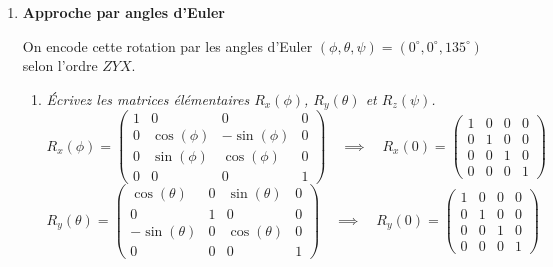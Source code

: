 \documentclass[a4paper,12pt]{article}
\begin{document}
\begin{enumerate}
    \item \textbf{Approche par angles d’Euler}

          On encode cette rotation par les angles d’Euler $(\phi, \theta, \psi) = (0^\circ, 0^\circ, 135^\circ)$ selon l’ordre $ZYX$.
          \begin{enumerate}
              \item \emph{Écrivez les matrices élémentaires $R_x(\phi)$, $R_y(\theta)$ et $R_z(\psi)$.}
              \begin{equation}
              R_x(\phi) = 
              \begin{pmatrix}
              1 & 0 & 0 & 0 \\
              0 & \cos(\phi) & -\sin(\phi) & 0 \\
              0 & \sin(\phi) & \cos(\phi) & 0 \\
              0 & 0 & 0 & 1
              \end{pmatrix}
              \quad \implies \quad
              \boxed{R_x(0) = 
              \begin{pmatrix}
              1 & 0 & 0 & 0 \\
              0 & 1 & 0 & 0 \\
              0 & 0 & 1 & 0 \\
              0 & 0 & 0 & 1
              \end{pmatrix}}
              \end{equation}
              \begin{equation}
              R_y(\theta) = 
              \begin{pmatrix}
              \cos(\theta) & 0 & \sin(\theta) & 0 \\
              0 & 1 & 0 & 0 \\
              -\sin(\theta) & 0 & \cos(\theta) & 0 \\
              0 & 0 & 0 & 1
              \end{pmatrix}
              \quad \implies \quad
              \boxed{R_y(0) = 
              \begin{pmatrix}
              1 & 0 & 0 & 0 \\
              0 & 1 & 0 & 0 \\
              0 & 0 & 1 & 0 \\
              0 & 0 & 0 & 1
              \end{pmatrix}}
              \end{equation}

\end{enumerate}
\end{enumerate}
\end{document}

